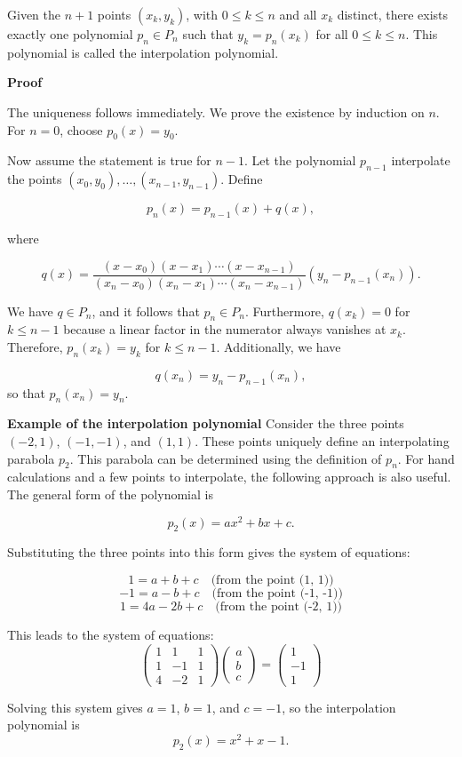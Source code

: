 Given the \(n+1\) points \((x_k, y_k)\), with \(0 \leq k \leq n\) and all \(x_k\) distinct, 
there exists exactly one polynomial \(p_n \in P_n\) such that \(y_k = p_n(x_k)\) for all \(0 \leq k \leq n\). 
This polynomial is called the interpolation polynomial.
\vspace{\baselineskip}

\textbf{Proof}

The uniqueness follows immediately. We prove the existence by induction on 
\(n\). For \(n = 0\), choose \(p_0(x) = y_0\). 
\vspace{\baselineskip}

Now assume the statement is true for \(n-1\). Let the polynomial \(p_{n-1}\) 
interpolate the points \((x_0, y_0), \ldots, (x_{n-1}, y_{n-1})\). Define

\[
p_n(x) = p_{n-1}(x) + q(x),
\]

where

\[
q(x) = \frac{(x - x_0)(x - x_1)\cdots(x - x_{n-1})}{(x_n - x_0)(x_n - x_1)\cdots(x_n - x_{n-1})} (y_n - p_{n-1}(x_n)).
\]

We have \(q \in P_n\), and it follows that \(p_n \in P_n\). 
Furthermore, \(q(x_k) = 0\) for \(k \leq n-1\) because a linear factor in 
the numerator always vanishes at \(x_k\). Therefore, \(p_n(x_k) = y_k\) for 
\(k \leq n-1\). Additionally, we have

\[
q(x_n) = y_n - p_{n-1}(x_n),
\]
so that \(p_n(x_n) = y_n\). 

\QED
\vspace{\baselineskip}

\textbf{Example of the interpolation polynomial}
\vspace{\baselineskip}
Consider the three points \((-2, 1)\), \((-1, -1)\), and \((1, 1)\). 
These points uniquely define an interpolating parabola \(p_2\). This parabola can be 
determined using the definition of \(p_n\). 
For hand calculations and a few 
points to interpolate, the following approach is also useful. The general form of the polynomial is 

\[
p_2(x) = ax^2 + bx + c.
\]

Substituting the three points into this form gives the system of equations:

\[
1 = a + b + c \quad \text{(from the point (1, 1))}
\]
\[
-1 = a - b + c \quad \text{(from the point (-1, -1))}
\]
\[
1 = 4a - 2b + c \quad \text{(from the point (-2, 1))}
\]

This leads to the system of equations:
\[
\begin{pmatrix}
1 & 1 & 1 \\
1 & -1 & 1 \\
4 & -2 & 1
\end{pmatrix}
\begin{pmatrix}
a \\
b \\
c
\end{pmatrix}
=
\begin{pmatrix}
1 \\
-1 \\
1
\end{pmatrix}
\]

Solving this system gives \(a = 1\), \(b = 1\), and \(c = -1\), so the interpolation polynomial is
\[
p_2(x) = x^2 + x - 1.
\]



